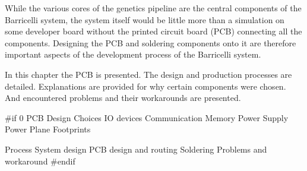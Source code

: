 
While the various cores of the genetics pipeline are the central components of the Barricelli system, the system itself would be little more than a simulation on some developer board without the printed circuit board (PCB) connecting all the components.
Designing the PCB and soldering components onto it are therefore important aspects of the development process of the Barricelli system.

In this chapter the PCB is presented.
The design and production processes are detailed.
Explanations are provided for why certain components were chosen.
And encountered problems and their workarounds are presented.

 \label{pcb:section:design_choices}

 \label{pcb:section:power_supply}

 \label{pcb:section:power_plane}

 \label{pcb:section:footprints}

 \label{pcb:section:budget}

 \label{pcb:section:process}

 \label{pcb:section:problems_and_workaround}

\#if 0
PCB
    Design Choices
        IO devices
        Communication
        Memory
    Power Supply
    Power Plane
    Footprints
        
    Process
        System design
        PCB design and routing
        Soldering
    Problems and workaround
\#endif
